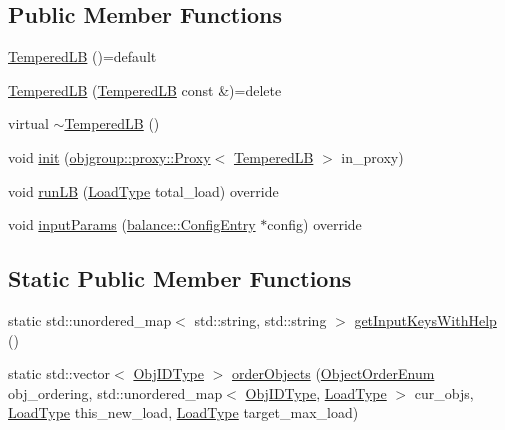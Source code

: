 \subsection*{Public Member Functions}
\begin{DoxyCompactItemize}
\item 
\hyperlink{structvt_1_1vrt_1_1collection_1_1lb_1_1_tempered_l_b_aa891f50b88bc2c43675205fe42f1a1bc}{Tempered\+LB} ()=default
\item 
\hyperlink{structvt_1_1vrt_1_1collection_1_1lb_1_1_tempered_l_b_a95a26dba017d5d4abbdd2e93cb3c32bd}{Tempered\+LB} (\hyperlink{structvt_1_1vrt_1_1collection_1_1lb_1_1_tempered_l_b}{Tempered\+LB} const \&)=delete
\item 
virtual \hyperlink{structvt_1_1vrt_1_1collection_1_1lb_1_1_tempered_l_b_ad8138112521d369244bd38a327c41832}{$\sim$\+Tempered\+LB} ()
\item 
void \hyperlink{structvt_1_1vrt_1_1collection_1_1lb_1_1_tempered_l_b_a57685d91f6518f5e479aba83f779d0f5}{init} (\hyperlink{structvt_1_1objgroup_1_1proxy_1_1_proxy}{objgroup\+::proxy\+::\+Proxy}$<$ \hyperlink{structvt_1_1vrt_1_1collection_1_1lb_1_1_tempered_l_b}{Tempered\+LB} $>$ in\+\_\+proxy)
\item 
void \hyperlink{structvt_1_1vrt_1_1collection_1_1lb_1_1_tempered_l_b_ace1513a46b9b5c195648262c5cc48783}{run\+LB} (\hyperlink{namespacevt_a8fb51741340b87d7aaee0bef60e9896b}{Load\+Type} total\+\_\+load) override
\item 
void \hyperlink{structvt_1_1vrt_1_1collection_1_1lb_1_1_tempered_l_b_aec119d63f5af1ce923578b70204ee622}{input\+Params} (\hyperlink{structvt_1_1vrt_1_1collection_1_1balance_1_1_config_entry}{balance\+::\+Config\+Entry} $\ast$config) override
\end{DoxyCompactItemize}
\subsection*{Static Public Member Functions}
\begin{DoxyCompactItemize}
\item 
static std\+::unordered\+\_\+map$<$ std\+::string, std\+::string $>$ \hyperlink{structvt_1_1vrt_1_1collection_1_1lb_1_1_tempered_l_b_a37e3599168c2a90967bd7dc7128c54f0}{get\+Input\+Keys\+With\+Help} ()
\item 
static std\+::vector$<$ \hyperlink{structvt_1_1vrt_1_1collection_1_1lb_1_1_base_l_b_a790b22acf448880599724749cdc4e9b3}{Obj\+I\+D\+Type} $>$ \hyperlink{structvt_1_1vrt_1_1collection_1_1lb_1_1_tempered_l_b_a3e3d0fa314e31fc65c8ede3fbae61e14}{order\+Objects} (\hyperlink{namespacevt_1_1vrt_1_1collection_1_1lb_a3c71e131f84e2ccbb95f43a1058c749c}{Object\+Order\+Enum} obj\+\_\+ordering, std\+::unordered\+\_\+map$<$ \hyperlink{structvt_1_1vrt_1_1collection_1_1lb_1_1_base_l_b_a790b22acf448880599724749cdc4e9b3}{Obj\+I\+D\+Type}, \hyperlink{namespacevt_a8fb51741340b87d7aaee0bef60e9896b}{Load\+Type} $>$ cur\+\_\+objs, \hyperlink{namespacevt_a8fb51741340b87d7aaee0bef60e9896b}{Load\+Type} this\+\_\+new\+\_\+load, \hyperlink{namespacevt_a8fb51741340b87d7aaee0bef60e9896b}{Load\+Type} target\+\_\+max\+\_\+load)
\end{DoxyCompactItemize}
